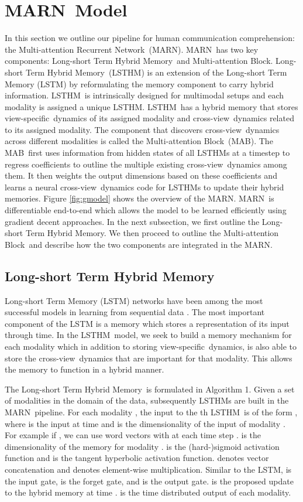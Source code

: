 \documentclass[letterpaper]{article} \usepackage{aaai18}  \usepackage{times}  \usepackage{helvet}  \usepackage{courier}  \usepackage{url}  \usepackage{graphicx}  \usepackage{multirow}
\newcommand{\pipeline}{Multi-attention Recurrent Network}
\newcommand{\pipelines}{MARN}
\newcommand{\mab}{Multi-attention Block}
\newcommand{\mabs}{MAB}
\newcommand{\intra}{view-specific}
\newcommand{\inter}{cross-view}
\newcommand{\tname}{Long-short Term Hybrid Memory}
\newcommand{\tnames}{LSTHM}
\begin{document}
\section{\pipelines \ Model}
In this section we outline our pipeline for human communication comprehension: the \pipeline \ (\pipelines). \pipelines \ has two key components: \tname \ and \mab.  \tname \ (\tnames) is an extension of the Long-short Term Memory (LSTM) by reformulating the memory component to carry hybrid information. \tnames \ is intrinsically designed for multimodal setups and each modality is assigned a unique \tnames. \tnames \ has a hybrid memory that stores \intra \ dynamics of its assigned modality and \inter \ dynamics related to its assigned modality. The component that discovers \inter \ dynamics across different modalities is called the \mab \ (\mabs). The \mabs \ first uses information from hidden states of all \tnames s at a timestep to regress coefficients to outline the multiple existing \inter \ dynamics among them. It then weights the output dimensions based on these coefficients and learns a neural \inter \ dynamics code for \tnames s to update their hybrid memories. Figure \ref{fig:gmodel} shows the overview of the \pipelines. \pipelines \ is differentiable end-to-end which allows the model to be learned efficiently using gradient decent approaches. In the next subsection, we first outline the \tname. We then proceed to outline the \mab \ and describe how the two components are integrated in the \pipelines.

\subsection{\tname}
Long-short Term Memory (LSTM) networks have been among the most successful models in learning from sequential data \cite{hochreiter1997long}. The most important component of the LSTM is a memory which stores a representation of its input through time. In the \tnames \ model, we seek to build a memory mechanism for each modality which in addition to storing \intra \ dynamics, is also able to store the \inter \ dynamics that are important for that modality. This allows the memory to function in a hybrid manner. 

The \tname \ is formulated in Algorithm 1. Given a set of  modalities in the domain of the data, subsequently  \tnames s are built in the \pipelines \ pipeline. For each modality , the input to the th \tnames \ is of the form , where  is the input at time  and  is the dimensionality of the input of modality . For example if , we can use word vectors with  at each time step .  is the dimensionality of the memory for modality .  is the (hard-)sigmoid activation function and  is the tangent hyperbolic activation function.  denotes vector concatenation and  denotes element-wise multiplication. Similar to the LSTM,  is the input gate,  is the forget gate, and  is the output gate.  is the proposed update to the hybrid memory  at time .  is the time distributed output of each modality. 
\end{document}
